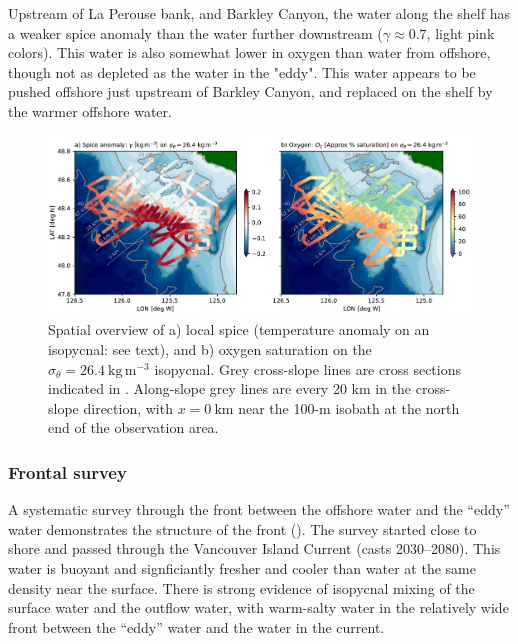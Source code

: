 \documentclass[draft]{agujournal2019}
\begin{document}
Upstream of La Perouse bank, and Barkley Canyon, the water along the shelf has a weaker spice anomaly than the water further downstream ($\gamma \approx 0.7$, light pink colors).  This water is also somewhat lower in oxygen than water from offshore, though not as depleted as the water in the "eddy".  This water appears to be pushed offshore just upstream of Barkley Canyon, and replaced on the shelf by the warmer offshore water.

\begin{figure}[htbp]
  \begin{center}
    \includegraphics[width=6.2in]{SpiceO2264}
    \caption{Spatial overview of a) local spice (temperature anomaly on an isopycnal: see text), and b) oxygen saturation on the $\sigma_{\theta} = 26.4\ \mathrm{kg\,m^{-3}}$ isopycnal.  Grey cross-slope lines are cross sections indicated in .  Along-slope grey lines are every 20 km in the cross-slope direction, with $x=0\ \mathrm{km}$ near the 100-m isobath at the north end of the observation area.
   \label{fig:SpiceO2264}
    }
  \end{center}
\end{figure}

\subsubsection{Frontal survey}

A systematic survey through the front between the offshore water and the ``eddy'' water demonstrates the structure of the front ().  The survey started close to shore and passed through the Vancouver Island Current (casts 2030--2080).  This water is buoyant and signficiantly fresher and cooler than water at the same density near the surface.  There is strong evidence of isopycnal mixing of the surface water and the outflow water, with warm-salty water in the relatively wide front between the ``eddy'' water and the water in the current.
\end{document}
